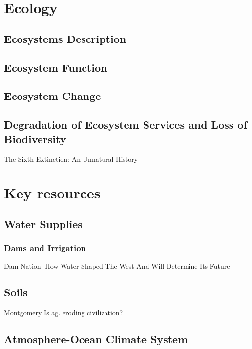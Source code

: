 \documentclass{tufte-book}\usepackage[]{graphicx}\usepackage[]{xcolor}
\begin{document}
\mainmatter



\chapter{Ecology}

\section{Ecosystems Description}

\section{Ecosystem Function}

\section{Ecosystem Change}

\section{Degradation of Ecosystem Services and Loss of Biodiversity}

The Sixth Extinction: An Unnatural History


\chapter{Key resources}

\section{Water Supplies}

\subsection{Dams and Irrigation}

Dam Nation: How Water Shaped The West And Will Determine Its Future

\section{Soils}

Montgomery Is ag. eroding civilization?



\section{Atmosphere-Ocean Climate System}
\end{document}
